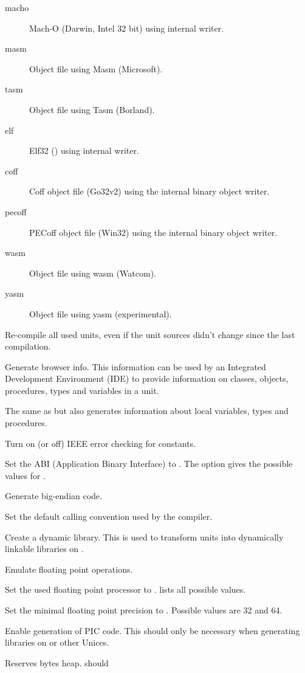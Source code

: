 \begin{description}
\begin{description}
\item[macho]    Mach-O (Darwin, Intel 32 bit) using internal writer.
\item[masm] Object file using Masm (Microsoft).
\item[tasm] Object file using Tasm (Borland).
\item[elf] Elf32 (\linux) using internal writer.
\item[coff] Coff object file (Go32v2) using the internal binary object writer.
\item[pecoff] PECoff object file (Win32) using the internal binary object writer.
\item[wasm] Object file using wasm (Watcom).
\item[yasm] Object file using yasm (experimental).
\end{description}
\item[-B]  Re-compile all used units, even
if the unit sources didn't change since the last compilation.
\item[-b]  Generate browser info. This information can
be used by an Integrated Development Environment (IDE) to provide information
on classes, objects, procedures, types  and variables in a unit.
\item[-bl]  The same as  but also generates
information about local variables, types and procedures.
\item[-C3] Turn on (or off) IEEE error checking for constants.
\item[-Caxxx] Set the ABI (Application Binary Interface) to .
The  option gives the possible values  for .
\item[-Cb] Generate big-endian code.
\item[-Cc] Set the default calling convention used by the compiler.
\item [-CD] Create a dynamic library. This is used to transform units into
dynamically linkable libraries on \linux.
\item[-Ce] Emulate floating point operations.
\item[-Cfxxx] Set the used floating point processor to .  lists all possible values.
\item[-CFNN] Set the minimal floating point precision to . Possible
values are 32 and 64.
\item[-Cg] Enable generation of PIC code. This should only be necessary when
generating libraries on \linux or other Unices.
\item [-Chxxx]  Reserves  bytes heap.  should

\end{description}
